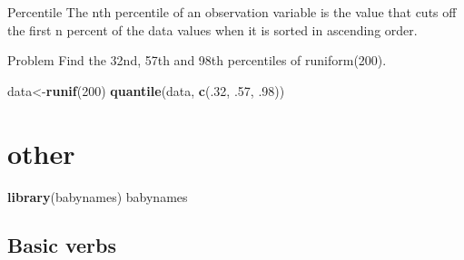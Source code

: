 \documentclass[]{book}
\newenvironment{Shaded}{\begin{snugshade}}{\end{snugshade}}
\newcommand{\CommentTok}[1]{\textcolor[rgb]{0.56,0.35,0.01}{\textit{#1}}}
\newcommand{\DecValTok}[1]{\textcolor[rgb]{0.00,0.00,0.81}{#1}}
\newcommand{\FloatTok}[1]{\textcolor[rgb]{0.00,0.00,0.81}{#1}}
\newcommand{\KeywordTok}[1]{\textcolor[rgb]{0.13,0.29,0.53}{\textbf{#1}}}
\newcommand{\NormalTok}[1]{#1}
\newcommand{\OperatorTok}[1]{\textcolor[rgb]{0.81,0.36,0.00}{\textbf{#1}}}
\newcommand{\StringTok}[1]{\textcolor[rgb]{0.31,0.60,0.02}{#1}}
\theoremstyle{definition}
\theoremstyle{definition}
\theoremstyle{definition}
\theoremstyle{remark}
\begin{document}
Percentile The nth percentile of an observation variable is the value
that cuts off the first n percent of the data values when it is sorted
in ascending order.

Problem Find the 32nd, 57th and 98th percentiles of runiform(200).

\begin{Shaded}
\begin{Highlighting}[]
\NormalTok{data<-}\KeywordTok{runif}\NormalTok{(}\DecValTok{200}\NormalTok{) }
\KeywordTok{quantile}\NormalTok{(data, }\KeywordTok{c}\NormalTok{(.}\DecValTok{32}\NormalTok{, }\FloatTok{.57}\NormalTok{, }\FloatTok{.98}\NormalTok{)) }
\end{Highlighting}
\end{Shaded}

\hypertarget{other}{%
\section{other}\label{other}}

\begin{Shaded}
\begin{Highlighting}[]
\KeywordTok{library}\NormalTok{(babynames)}
\NormalTok{babynames}
\end{Highlighting}
\end{Shaded}

\hypertarget{basic-verbs}{%
\subsection{Basic verbs}\label{basic-verbs}}

\begin{Shaded}
\end{Shaded}

\begin{Shaded}
\end{Shaded}

\begin{Shaded}
\end{Shaded}
\end{document}
